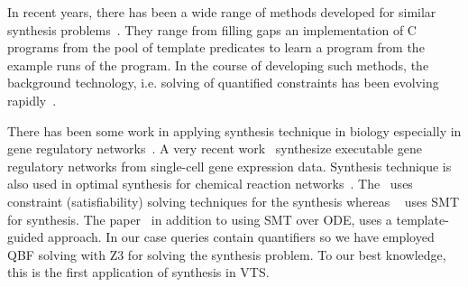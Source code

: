 In recent years, there has been a wide range of methods
developed for similar synthesis problems~\cite{sketch,sygus,exampleSynth}.
%
They range from filling gaps an implementation of C programs from the pool of template predicates to learn a program from the example
runs of the program.
%
In the course of developing such methods,
the background technology, i.e. solving of quantified
constraints has been evolving rapidly~\cite{lonsing2010depqbf,z3Quant}.
%

There has been some work in applying synthesis technique in biology especially in gene regulatory networks~\cite{shavit2016automated, fisher2015synthesising}. A very recent work~\cite{fisher2015synthesising} synthesize executable gene regulatory networks from single-cell gene expression data.
Synthesis technique is also used in optimal synthesis for chemical reaction networks~\cite{cardelli2017syntax}. The~\cite{fisher2015synthesising} uses constraint (satisfiability) solving techniques for the synthesis whereas ~\cite{shavit2016automated} uses SMT for synthesis. The paper~\cite{cardelli2017syntax} in addition to using SMT over ODE, uses a template-guided approach. In our case queries contain quantifiers so we have employed QBF solving with Z3 for solving the synthesis problem. To our best knowledge, this is the first application of synthesis in VTS.
